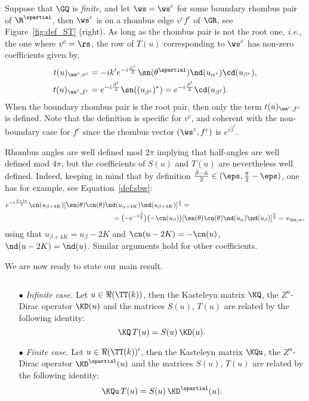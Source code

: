 \documentclass[a4paper,twoside,11pt]{article}
\begin{document}
Suppose that $\GQ$ is \emph{finite}, and let $\ws=\ws^c$ for some boundary rhombus pair of $\R^{\spartial}$, 
then $\ws^c$ is on a rhombus edge $v^c f^c$
of $\GR$, see Figure~\ref{fig:def_ST} (right). As long as the rhombus pair is not the root one, \emph{i.e.}, the one where $v^c=\rs$,
the row of $T(u)$ corresponding to $\ws^c$ has non-zero coefficients
given by,
\begin{align}\label{def:twv_boundary}
\begin{split}
t(u)_{\ws^c,v^c}&=
-i k' e^{-i\frac{\bar{\alpha}^r}{2}}\sn(\theta^\spartial)\nd(u_{\alpha^r})\cd(u_{\beta^r}),\\
t(u)_{\ws^c,f^c}&=e^{-i\frac{\bar{\beta}^\ell}{2}}\sn((u_{\beta^\ell})^*)=
e^{-i\frac{\bar{\beta}^\ell}{2}}\cd(u_{\beta^\ell}).
\end{split}
\end{align}
When the boundary rhombus pair is the root pair, then only the term $t(u)_{\ws^c,f^c}$ is defined.
Note that the definition is specific for $v^c$, and coherent with the non-boundary case for $f^c$ since the rhombus vector 
$(\ws^c,f^c)$ is $e^{i\bar{\beta}^\ell}$.

\begin{rem}
Rhombus angles are well defined mod $2\pi$ implying that half-angles are well defined mod $4\pi$,
but the coefficients of $S(u)$ and $T(u)$ are nevertheless well defined. Indeed, keeping
in mind that by definition $\frac{\bar{\beta}-\bar{\alpha}}{2}\in(\eps,\frac{\pi}{2}-\eps)$, one has 
for example, see Equation~\eqref{def:sbw}: 
\begin{align*}
e^{-i\frac{\bar{\beta}+2\pi}{2}}\cn(u_{\beta+4K})[\sn(\theta)\cn(\theta)\nd(u_{\alpha+4K})\nd(u_{\beta+4K})]^{\frac{1}{2}}&=\\
=\bigl(-e^{-i\frac{\bar{\beta}}{2}}\bigr)\bigl(-\cn(u_\beta)\bigr)&
  [\sn(\theta)\cn(\theta)\nd(u_\alpha)\nd(u_\beta)]^{\frac{1}{2}}=s_{\bs,w},
\end{align*}
using that $u_{\beta+4K}=u_{\beta}-2K$ and $\cn(u-2K)=-\cn(u)$, $\nd(u-2K)=\nd(u)$. 
Similar arguments hold for other coefficients.
\end{rem}

We are now ready to state our main result.

\begin{thm}\label{thm:main}$\,$
\begin{itemize}
\item[$\bullet$] \emph{Infinite case.} Let $u\in\Re(\TT(k))$, then the Kasteleyn matrix $\KQ$, the $Z^u$-Dirac operator
$\KD(u)$ and the matrices $S(u)$, $T(u)$ are related by the following identity:
\begin{equation}
\KQ\,T(u) = S(u)\, \KD(u). \label{equ:thm_main_3}
\end{equation}
\item[$\bullet$] \emph{Finite case.} Let $u\in\Re(\TT(k))'$, then the Kasteleyn matrix $\KQu$, the $Z^u$-Dirac operator $\KD^\spartial(u)$
and the matrices $S(u)$, $T(u)$ are related by the following identity:
\begin{equation}
\KQu\,T(u) = S(u)\, \KD^\spartial(u). \label{equ:thm_main_4}
\end{equation}
\end{itemize}
\end{thm}
\end{document}
